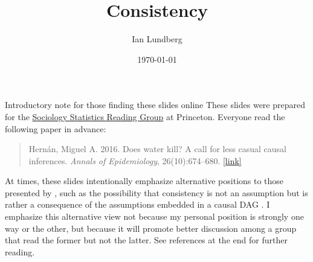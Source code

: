 \documentclass{beamer}
\title{Consistency}
\author{Ian Lundberg}
\institute[Princeton University] %
{
  Department of Sociology and Office of Population Research\\
  Princeton University
}
\date{\today}
\newcommand{\blue}[1]{\textcolor{blue}{#1}}
\begin{document}

\begin{frame}{Introductory note for those finding these slides online}
These slides were prepared for the \href{https://scholar.princeton.edu/bstewart/sociology-statistics-reading-group}{Sociology Statistics Reading Group} at Princeton. Everyone read the following paper in advance:
\begin{quote}\normalfont
Hern\'an, Miguel A. 2016. Does water kill? A call for less casual causal inferences. \emph{Annals of Epidemiology}, 26(10):674--680. \blue{\href{https://www.ncbi.nlm.nih.gov/pmc/articles/PMC5207342/}{[link]}}
\end{quote}
At times, these slides intentionally emphasize alternative positions to those presented by \citet{hernan2016}, such as the possibility that consistency is not an assumption but is rather a consequence of the assumptions embedded in a causal DAG \citep{pearl2010}. I emphasize this alternative view not because my personal position is strongly one way or the other, but because it will promote better discussion among a group that read the former but not the latter. See references at the end for further reading.
\end{frame}
\end{document}
